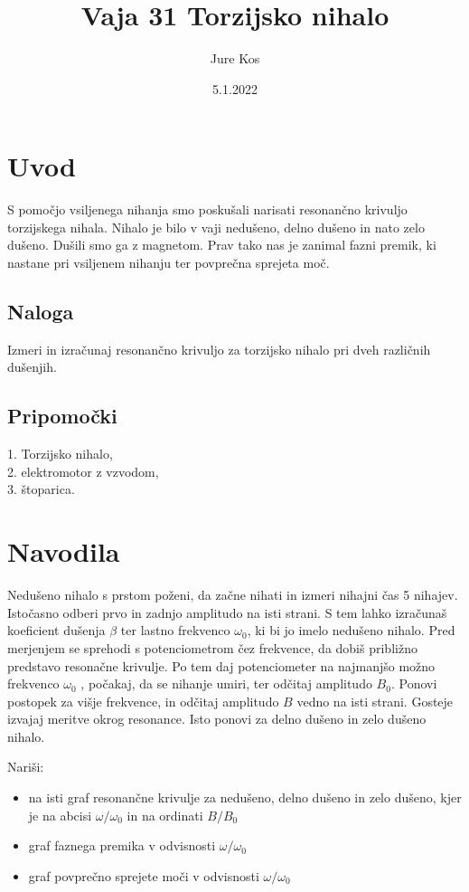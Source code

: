 \documentclass[a4paper]{report}
\title{Vaja 31 Torzijsko nihalo}
\author {Jure Kos}
\date {5.1.2022}
\begin{document}
\maketitle

\chapter*{Uvod}

S pomočjo vsiljenega nihanja smo poskušali narisati resonančno krivuljo torzijskega nihala. Nihalo je bilo v vaji nedušeno, delno dušeno in nato zelo dušeno. Dušili smo ga z magnetom.
Prav tako nas je zanimal fazni premik, ki nastane pri vsiljenem nihanju ter povprečna sprejeta moč.

\section*{Naloga}
Izmeri in izračunaj resonančno krivuljo za torzijsko nihalo pri dveh različnih dušenjih.

\section*{Pripomočki}

1. Torzijsko nihalo,\\
2. elektromotor z vzvodom,\\
3. štoparica.\\




\chapter*{Navodila}

Nedušeno nihalo s prstom poženi, da začne nihati in izmeri nihajni čas 5 nihajev. Istočasno odberi prvo in zadnjo amplitudo na isti strani. S tem lahko izračunaš koeficient dušenja $\beta$ ter lastno frekvenco $ \omega_0$, ki bi jo imelo nedušeno nihalo. 
 Pred merjenjem se sprehodi s potenciometrom čez frekvence, da dobiš približno predstavo resonačne krivulje. Po tem daj potenciometer na najmanjšo možno frekvenco $\omega_0$ , počakaj,
 da se nihanje umiri, ter odčitaj amplitudo $B_0$. Ponovi postopek za višje frekvence, in odčitaj amplitudo $B$ vedno na isti strani. Gosteje izvajaj meritve okrog resonance. Isto ponovi za delno dušeno in zelo dušeno nihalo.\par
\noindent Nariši:

\begin{itemize}
\item na isti graf resonančne krivulje  za nedušeno, delno dušeno in zelo dušeno, kjer je na abcisi $\omega/ \omega_0$ in na ordinati $B/B_0$
\item graf faznega premika v odvisnosti $\omega/ \omega_0$
\item graf povprečno sprejete moči v odvisnosti $\omega/\omega_0$
\end{itemize}
\end{document}
